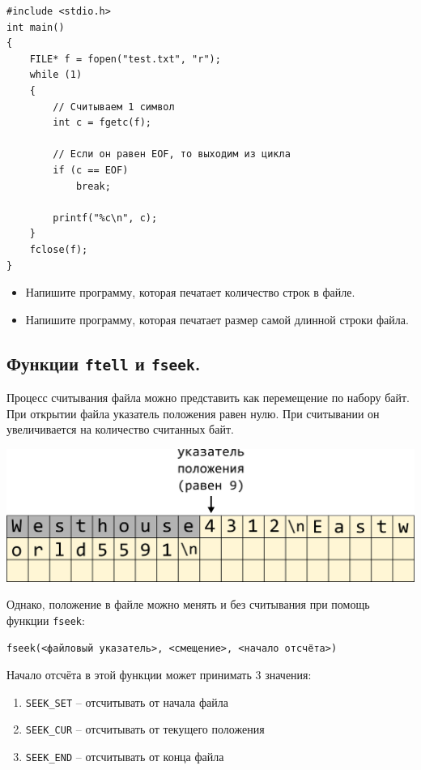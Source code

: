 \documentclass{article}
\begin{document}
\begin{lstlisting}
#include <stdio.h>
int main()
{
	FILE* f = fopen("test.txt", "r");
	while (1)
	{
		// Считываем 1 символ
		int c = fgetc(f);
		
		// Если он равен EOF, то выходим из цикла
		if (c == EOF)
			break;
			
		printf("%c\n", c);
	}
	fclose(f);
}
\end{lstlisting}

\begin{itemize}
\item Напишите программу, которая печатает количество строк в файле.
\item Напишите программу, которая печатает размер самой длинной строки файла.
\end{itemize}

\subsection*{Функции \texttt{ftell} и \texttt{fseek}.}

Процесс считывания файла можно представить как перемещение по набору байт. При открытии файла указатель положения равен нулю. При считывании он увеличивается на количество считанных байт.
\begin{center}
\includegraphics[scale=0.8]{../images/positioninfile.png}
\end{center}

Однако, положение в файле можно менять и без считывания при помощь функции \texttt{fseek}:
\begin{verbatim}
fseek(<файловый указатель>, <смещение>, <начало отсчёта>)
\end{verbatim}
Начало отсчёта в этой функции может принимать 3 значения:
\begin{enumerate}
\item \texttt{SEEK\_SET} -- отсчитывать от начала файла
\item \texttt{SEEK\_CUR} -- отсчитывать от текущего положения
\item \texttt{SEEK\_END} -- отсчитывать от конца файла
\end{enumerate}
\end{document}
